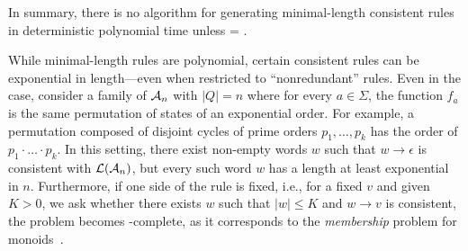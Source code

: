 In summary, there is no algorithm for generating minimal-length consistent rules in deterministic polynomial time unless \PTIME = \NP.

While minimal-length rules are polynomial, certain consistent rules can be exponential in length—even when restricted to ``nonredundant'' rules. 
Even in the \DFA case, consider a family of \DFA  $\mathcal{A}_n$ with $|Q| = n$ where for every $a \in \Sigma$, the function $f_a$ is the same permutation of states of an exponential order.
For example, a permutation composed of disjoint cycles of prime orders $p_1, \ldots, p_k$ has the order of $p_1 \cdot \ldots \cdot p_k$.
In this setting, there exist non-empty words $w$ such that $w \to \epsilon$ is consistent with $\mathcal{L}(\mathcal{A}_n)$, but every such word $w$ has a length at least exponential in $n$.
Furthermore, if one side of the rule is fixed, i.e., for a fixed $v$ and given $K>0$, we ask whether there exists $w$ such that $|w| \leq K$ and $w \to v$ is consistent, the problem becomes \PSPACE-complete, as it corresponds to the \emph{membership}  problem for monoids~\cite{Kozen77}.
  





